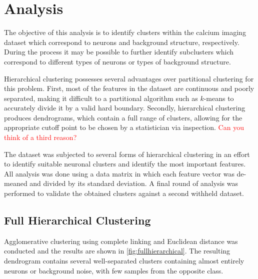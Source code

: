 \documentclass[10pt]{article}
\newcommand{\todo}[1]{\textcolor{red}{#1}}
\begin{document}

  

\section{Analysis}

The objective of this analysis is to identify clusters within the calcium imaging dataset which correspond to neurons and background structure, respectively. During the process it may be possible to further identify subclusters which correspond to different types of neurons or types of background structure.

Hierarchical clustering possesses several advantages over partitional clustering for this problem.
First, most of the features in the dataset are continuous and poorly separated, making it difficult to a partitional algorithm such as $k$-means to accurately divide it by a valid hard boundary. 
Secondly, hierarchical clustering produces dendrograms, which contain a full range of clusters, allowing for the appropriate cutoff point to be chosen by a statistician via inspection. 
\todo{Can you think of a third reason?}

The dataset was subjected to several forms of hierarchical clustering in an effort to identify suitable neuronal clusters and identify the most important features. 
All analysis was done using a data matrix in which each feature vector was de-meaned and divided by its standard deviation.
A final round of analysis was performed to validate the obtained clusters against a second withheld dataset.

\subsection{Full Hierarchical Clustering}

Agglomerative clustering using complete linking and Euclidean distance was conducted and the results are shown in \cref{fig:fullhierarchical}.
The resulting dendrogram contains several well-separated clusters containing almost entirely neurons or background noise, with few samples from the opposite class.
\end{document}
